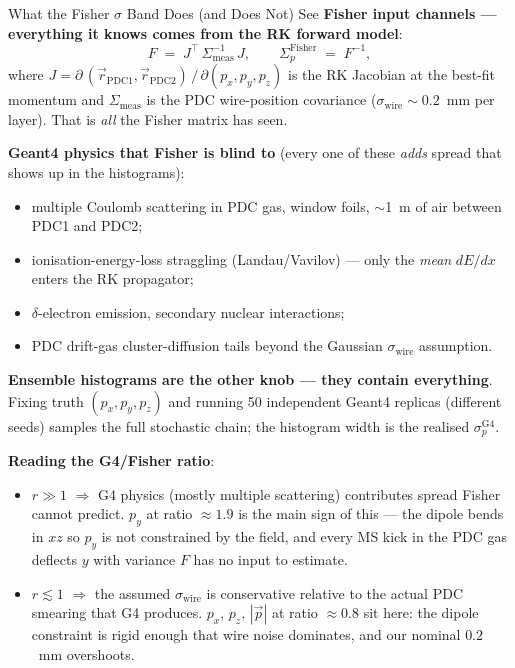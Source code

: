 \documentclass[aspectratio=169]{beamer}
\begin{document}
\begin{frame}{What the Fisher $\sigma$ Band Does (and Does Not) See}
\small
\textbf{Fisher input channels --- everything it knows comes from the RK forward model}:
\[
F \;=\; J^{\!\top}\,\Sigma_\mathrm{meas}^{-1}\,J,
\qquad
\Sigma_p^\mathrm{Fisher} \;=\; F^{-1},
\]
where $J = \partial\,(\vec r_\mathrm{PDC1},\vec r_\mathrm{PDC2})\,/\,\partial(p_x,p_y,p_z)$ is the RK Jacobian at the best-fit momentum and $\Sigma_\mathrm{meas}$ is the PDC wire-position covariance ($\sigma_\mathrm{wire}\!\sim\!0.2$~mm per layer). That is \emph{all} the Fisher matrix has seen.

\vspace{0.10cm}
\textbf{Geant4 physics that Fisher is blind to} (every one of these \emph{adds} spread that shows up in the histograms):
\begin{itemize}\itemsep0pt
  \item multiple Coulomb scattering in PDC gas, window foils, $\sim$1~m of air between PDC1 and PDC2;
  \item ionisation-energy-loss straggling (Landau/Vavilov) --- only the \emph{mean} $dE/dx$ enters the RK propagator;
  \item $\delta$-electron emission, secondary nuclear interactions;
  \item PDC drift-gas cluster-diffusion tails beyond the Gaussian $\sigma_\mathrm{wire}$ assumption.
\end{itemize}

\vspace{0.05cm}
\textbf{Ensemble histograms are the other knob --- they contain everything}. Fixing truth $(p_x,p_y,p_z)$ and running 50 independent Geant4 replicas (different seeds) samples the full stochastic chain; the histogram width is the realised $\sigma_p^\mathrm{G4}$.

\vspace{0.05cm}
\textbf{Reading the G4/Fisher ratio}:
\begin{itemize}\itemsep0pt
  \item $r \gg 1$ $\Rightarrow$ G4 physics (mostly multiple scattering) contributes spread Fisher cannot predict. $p_y$ at ratio $\approx\!1.9$ is the main sign of this --- the dipole bends in $xz$ so $p_y$ is not constrained by the field, and every MS kick in the PDC gas deflects $y$ with variance $F$ has no input to estimate.
  \item $r \lesssim 1$ $\Rightarrow$ the assumed $\sigma_\mathrm{wire}$ is conservative relative to the actual PDC smearing that G4 produces. $p_x,\,p_z,\,|\vec p|$ at ratio $\approx\!0.8$ sit here: the dipole constraint is rigid enough that wire noise dominates, and our nominal $0.2$~mm overshoots.
\end{itemize}


\end{frame}
\end{document}
